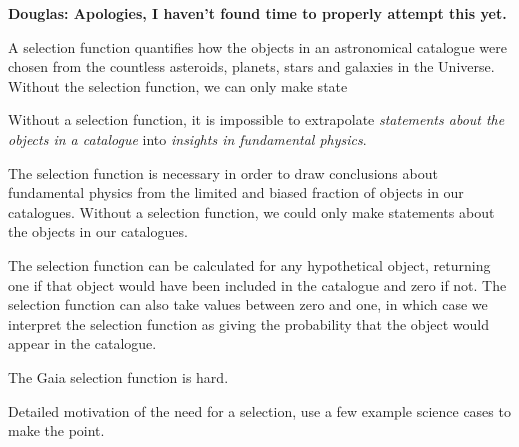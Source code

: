 \textbf{Douglas: Apologies, I haven't found time to properly attempt this yet.}

A selection function quantifies how the objects in an astronomical catalogue were chosen from the countless asteroids, planets, stars and galaxies in the Universe. Without the selection function, we can only make state

Without a selection function, it is impossible to extrapolate \textit{statements about the objects in a catalogue} into \textit{insights in fundamental physics}. 

The selection function is necessary in order to draw conclusions about fundamental physics from the limited and biased fraction of objects in our catalogues. Without a selection function, we could only make statements about the objects in our catalogues.

The selection function can be calculated for any hypothetical object, returning one if that object would have been included in the catalogue and zero if not. The selection function can also take values between zero and one, in which case we interpret the selection function as giving the probability that the object would appear in the catalogue.

The Gaia selection function is hard.



Detailed motivation of the need for a selection, use a few example science cases to make the point.

